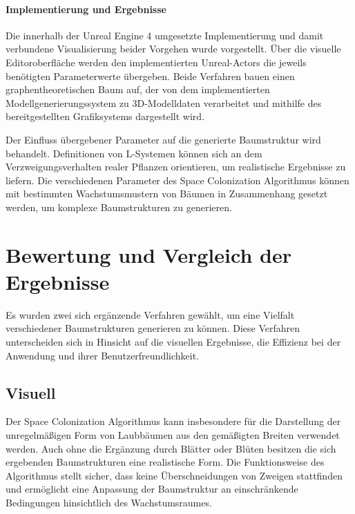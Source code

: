 \paragraph{Implementierung und Ergebnisse}

Die innerhalb der Unreal Engine 4 umgesetzte Implementierung und damit verbundene Visualisierung beider Vorgehen wurde vorgestellt. Über die visuelle Editoroberfläche werden den implementierten Unreal-Actors die jeweils benötigten Parameterwerte übergeben. Beide Verfahren bauen einen graphentheoretischen Baum auf, der von dem implementierten Modellgenerierungssystem zu 3D-Modelldaten verarbeitet und mithilfe des bereitgestellten Grafiksystems dargestellt wird.

Der Einfluss übergebener Parameter auf die generierte Baumstruktur wird behandelt. Definitionen von L-Systemen können sich an dem Verzweigungsverhalten realer Pflanzen orientieren, um realistische Ergebnisse zu liefern. \cite[S.51ff]{ABOP:04} Die verschiedenen Parameter des Space Colonization Algorithmus können mit bestimmten Wachstumsmustern von Bäumen in Zusammenhang gesetzt werden, um komplexe Baumstrukturen zu generieren. \cite[S.5]{SpaceColonizationAlgorithm:07}

\section{Bewertung und Vergleich der Ergebnisse}

Es wurden zwei sich ergänzende Verfahren gewählt, um eine Vielfalt verschiedener Baumstrukturen generieren zu können. Diese Verfahren unterscheiden sich in Hinsicht auf die visuellen Ergebnisse, die Effizienz bei der Anwendung und ihrer Benutzerfreundlichkeit.

\subsection{Visuell}

Der Space Colonization Algorithmus kann insbesondere für die Darstellung der unregelmäßigen Form von Laubbäumen aus den gemäßigten Breiten verwendet werden. Auch ohne die Ergänzung durch Blätter oder Blüten besitzen die sich ergebenden Baumstrukturen eine realistische Form. Die Funktionsweise des Algorithmus stellt sicher, dass keine Überschneidungen von Zweigen stattfinden und ermöglicht eine Anpassung der Baumstruktur an einschränkende Bedingungen hinsichtlich des Wachstumsraumes. \cite[S.5]{SpaceColonizationAlgorithm:07}

